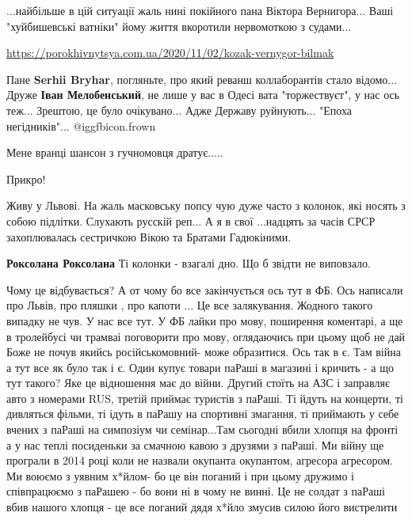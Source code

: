 \begin{itemize}
\begin{itemize}

...найбільше в цій ситуації жаль нині покійного пана Віктора Вернигора... Ваші
"хуйбишевські ватніки" йому життя вкоротили нервомоткою з судами...

\url{https://porokhivnytsya.com.ua/2020/11/02/kozak-vernygor-bilmak}

Пане \textbf{Serhii Bryhar}, погляньте, про який реванш коллаборантів стало відомо...
Друже \textbf{Іван Мелобенський}, не лише у вас в Одесі вата "торжествуєт", у нас ось теж...
Зрештою, це було очікувано...
Адже Державу руйнують...
"Епоха негідників"...
 @igg{fbicon.frown} 

\end{itemize} %

Мене вранці шансон з гучномовця дратує.....

Прикро!


Живу у Львові. На жаль масковську попсу чую дуже часто з колонок, які носять з
собою підлітки. Слухають русскій реп... А я в свої ...надцять за часів СРСР
захоплювалась сестричкою Вікою та Братами Гадюкіними.

\begin{itemize} %
\textbf{Роксолана Роксолана} Ті колонки - взагалі дно. Що б звідти не виповзало.
\end{itemize} %


Чому це відбувається? А от чому бо все закінчується ось тут в ФБ. Ось написали
про Львів, про пляшки , про капоти ... Це все залякування. Жодного такого
випадку не чув. У нас все тут. У ФБ лайки про мову, поширення коментарі, а ще в
тролейбусі чи трамваі поговорити про мову, оглядаючись при цьому щоб не дай
Боже не почув якийсь російськомовний- може образитися. Ось так в є. Там війна а
тут все як було так і є. Один купує товари паРаші в магазині і кричить - а що
тут такого? Яке це відношення має до війни. Другий стоїть на АЗС і заправляє
авто з номерами RUS, третій приймає туристів з паРаші. Ті йдуть на концерти, ті
дивляться фільми, ті ідуть в паРашу на спортивні змагання, ті приймають у себе
вчених з паРаші на симпозіум чи семінар...Там сьогодні вбили хлопця на фронті а
у нас теплі посиденьки за смачною кавою з друзями з паРаші. Ми війну ще
програли в 2014 році коли не назвали окупанта окупантом, агресора агресором. Ми
воюємо з уявним х*йлом- бо це він поганий і при цьому дружимо і співпрацюємо з
паРашею - бо вони ні в чому не винні. Це не солдат з паРаші вбив нашого хлопця
- це все поганий дядя х*йло змусив силою його вистрелити


\end{itemize}
